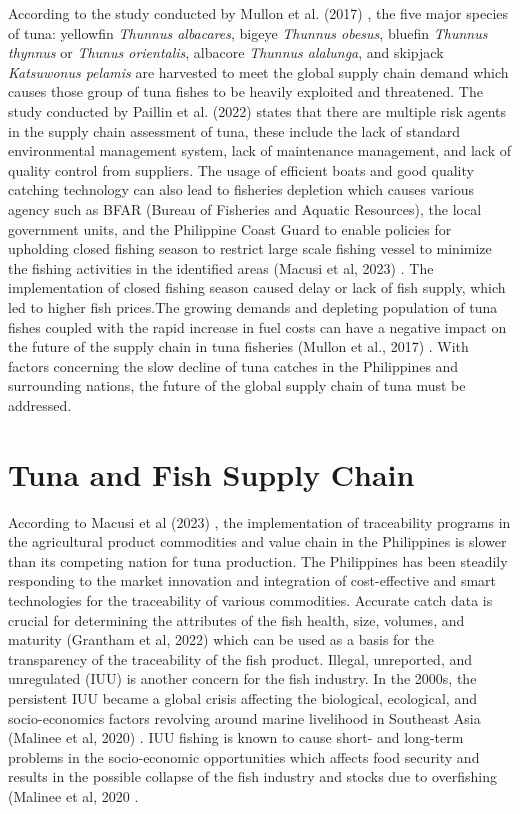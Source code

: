 According to the study conducted by Mullon et al. (2017) \nocite{rrl-FRP3}, the five major species of tuna: yellowfin \textit{Thunnus albacares}, bigeye \textit{Thunnus obesus}, bluefin \textit{Thunnus thynnus} or \textit{Thunus orientalis}, albacore \textit{Thunnus alalunga}, and skipjack \textit{Katsuwonus pelamis} are harvested to meet the global supply chain demand  which causes those group of tuna fishes to be heavily exploited and threatened. The study conducted by Paillin et al. (2022) \nocite{rrl-FRP4} states that there are multiple risk agents in the supply chain assessment of tuna, these include the lack of standard environmental management system, lack of maintenance management, and lack of quality control from suppliers. The usage of efficient boats and good quality catching technology can also lead to fisheries depletion which causes various agency such as BFAR (Bureau of Fisheries and Aquatic Resources), the local government units, and the Philippine Coast Guard to enable policies for upholding closed fishing season to restrict large scale fishing vessel to minimize the fishing activities in the identified areas (Macusi et al, 2023) \nocite{rrl-TFSC4}. The implementation of closed fishing season caused delay or lack of fish supply, which led to higher fish prices.The growing demands and depleting population of tuna fishes coupled with the rapid increase in fuel costs can have a negative impact on the future of the supply chain in tuna fisheries (Mullon et al., 2017) \nocite{rrl-FRP2}. With factors concerning the slow decline of tuna catches in the Philippines and surrounding nations, the future of the global supply chain of tuna must be addressed.

\section{Tuna and Fish Supply Chain}

According to Macusi et al (2023) \nocite{rrl-TFSC1}, the implementation of traceability programs in the agricultural product commodities and value chain in the Philippines is slower than its competing nation for tuna production. The Philippines has been steadily responding to the market innovation and integration of cost-effective and smart technologies for the traceability of various commodities. Accurate catch data is crucial for determining the attributes of the fish health, size, volumes, and maturity (Grantham et al, 2022) \nocite{rrl-TFSC2} which can be used as a basis for the transparency of the traceability of the fish product. Illegal, unreported, and unregulated (IUU) is another concern for the fish industry. In the 2000s, the persistent IUU became a global crisis affecting the biological, ecological, and socio-economics factors revolving around marine livelihood in Southeast Asia (Malinee et al, 2020) \nocite{rrl-TFSC3}. IUU fishing is known to cause short- and long-term problems in the socio-economic opportunities which affects food security and results in the possible collapse of the fish industry and stocks due to overfishing (Malinee et al, 2020 \nocite{rrl-TFSC3}. 

